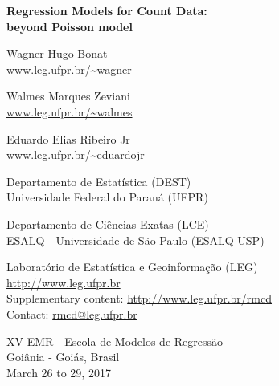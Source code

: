 \thispagestyle{empty}
\cleardoublepage
\thispagestyle{empty}


\begin{flushleft}
  \Large \bf
  Regression Models for Count Data:\\
  beyond Poisson model
\end{flushleft}
\vspace*{1.5em}

\begin{flushleft}
Wagner Hugo Bonat\footnotemark[1] \footnotemark[3]\\
\url{www.leg.ufpr.br/~wagner}

Walmes Marques Zeviani\footnotemark[1] \footnotemark[3]\\
\url{www.leg.ufpr.br/~walmes}

Eduardo Elias Ribeiro Jr\footnotemark[2] \footnotemark[3]\\
\url{www.leg.ufpr.br/~eduardojr}
\end{flushleft}
\vspace*{2em}


\footnotemark[1]Departamento de Estatística (DEST)\\
\hspace*{1.5mm}Universidade Federal do Paraná (UFPR)

\footnotemark[2]Departamento de Ciências Exatas (LCE)\\
\hspace*{1.5mm}ESALQ - Universidade de São Paulo (ESALQ-USP)

\footnotemark[3]Laboratório de Estatística e Geoinformação (LEG)\\
\hspace*{1.5mm}\url{http://www.leg.ufpr.br}\\

Supplementary content: \url{http://www.leg.ufpr.br/rmcd}\\
Contact: \url{rmcd@leg.ufpr.br}
\vspace*{\fill}

\begin{center}
XV EMR - Escola de Modelos de Regressão\\
Goiânia - Goiás, Brasil\\
March 26 to 29, 2017
\end{center}

\clearpage
\thispagestyle{empty}
\pagebreak

\setcounter{page}{1}
